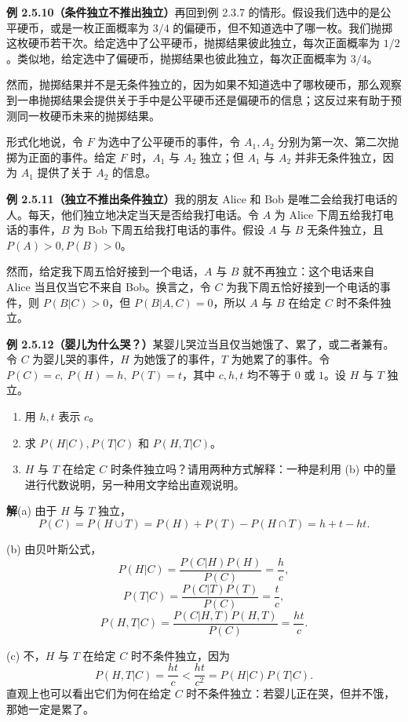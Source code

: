 \documentclass[UTF8,12pt,a4paper,fontset=fandol]{ctexart}
\begin{document}
\noindent\textbf{例 2.5.10（条件独立不推出独立）}\quad 再回到例 2.3.7 的情形。假设我们选中的是公平硬币，或是一枚正面概率为 $3/4$ 的偏硬币，但不知道选中了哪一枚。我们抛掷这枚硬币若干次。给定选中了公平硬币，抛掷结果彼此独立，每次正面概率为 $1/2$。类似地，给定选中了偏硬币，抛掷结果也彼此独立，每次正面概率为 $3/4$。

然而，抛掷结果并不是无条件独立的，因为如果不知道选中了哪枚硬币，那么观察到一串抛掷结果会提供关于手中是公平硬币还是偏硬币的信息；这反过来有助于预测同一枚硬币未来的抛掷结果。

形式化地说，令 $F$ 为选中了公平硬币的事件，令 $A_1,A_2$ 分别为第一次、第二次抛掷为正面的事件。给定 $F$ 时，$A_1$ 与 $A_2$ 独立；但 $A_1$ 与 $A_2$ 并非无条件独立，因为 $A_1$ 提供了关于 $A_2$ 的信息。

\noindent\textbf{例 2.5.11（独立不推出条件独立）}\quad 我的朋友 Alice 和 Bob 是唯二会给我打电话的人。每天，他们独立地决定当天是否给我打电话。令 $A$ 为 Alice 下周五给我打电话的事件，$B$ 为 Bob 下周五给我打电话的事件。假设 $A$ 与 $B$ 无条件独立，且 $P(A)>0,P(B)>0$。

然而，给定我下周五恰好接到一个电话，$A$ 与 $B$ 就不再独立：这个电话来自 Alice 当且仅当它不来自 Bob。换言之，令 $C$ 为我下周五恰好接到一个电话的事件，则 $P(B|C)>0$，但 $P(B|A,C)=0$，所以 $A$ 与 $B$ 在给定 $C$ 时不条件独立。

\noindent\textbf{例 2.5.12（婴儿为什么哭？）}\quad 某婴儿哭泣当且仅当她饿了、累了，或二者兼有。令 $C$ 为婴儿哭的事件，$H$ 为她饿了的事件，$T$ 为她累了的事件。令 $P(C)=c,\ P(H)=h,\ P(T)=t$，其中 $c,h,t$ 均不等于 $0$ 或 $1$。设 $H$ 与 $T$ 独立。

\begin{enumerate}
  \item[(a)] 用 $h,t$ 表示 $c$。
  \item[(b)] 求 $P(H|C),P(T|C)$ 和 $P(H,T|C)$。
  \item[(c)] $H$ 与 $T$ 在给定 $C$ 时条件独立吗？请用两种方式解释：一种是利用 (b) 中的量进行代数说明，另一种用文字给出直观说明。
\end{enumerate}

\noindent\textbf{解}\quad (a) 由于 $H$ 与 $T$ 独立，
\[
  P(C)=P(H\cup T)=P(H)+P(T)-P(H\cap T)=h+t-ht.
\]

(b) 由贝叶斯公式，
\[
  P(H|C)=\frac{P(C|H)P(H)}{P(C)}=\frac{h}{c},
\]
\[
  P(T|C)=\frac{P(C|T)P(T)}{P(C)}=\frac{t}{c},
\]
\[
  P(H,T|C)=\frac{P(C|H,T)P(H,T)}{P(C)}=\frac{ht}{c}.
\]

(c) 不，$H$ 与 $T$ 在给定 $C$ 时不条件独立，因为
\[
  P(H,T|C)=\frac{ht}{c}<\frac{ht}{c^2}=P(H|C)P(T|C).
\]
直观上也可以看出它们为何在给定 $C$ 时不条件独立：若婴儿正在哭，但并不饿，那她一定是累了。
\end{document}
